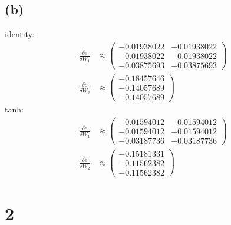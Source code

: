 \documentclass{article}
\begin{document}
	\subsection*{(b)}
		identity:
		\begin{align*}
			\frac{\delta e}{\delta W_1} &\approx
			\begin{pmatrix}
				-0.01938022 & -0.01938022\\
				-0.01938022 & -0.01938022\\
				-0.03875693 & -0.03875693
			\end{pmatrix}\\
			\frac{\delta e}{\delta W_2} &\approx
			\begin{pmatrix}
				-0.18457646\\
				-0.14057689\\
				-0.14057689
			\end{pmatrix}
		\end{align*}
		tanh:
		\begin{align*}
			\frac{\delta e}{\delta W_1} &\approx
			\begin{pmatrix}
				-0.01594012 & -0.01594012\\
				-0.01594012 & -0.01594012\\
				-0.03187736 & -0.03187736
			\end{pmatrix}\\
			\frac{\delta e}{\delta W_2} &\approx
			\begin{pmatrix}
				-0.15181331\\
				-0.11562382\\
				-0.11562382
			\end{pmatrix}
		\end{align*}
		
	\section*{2}
\end{document}
